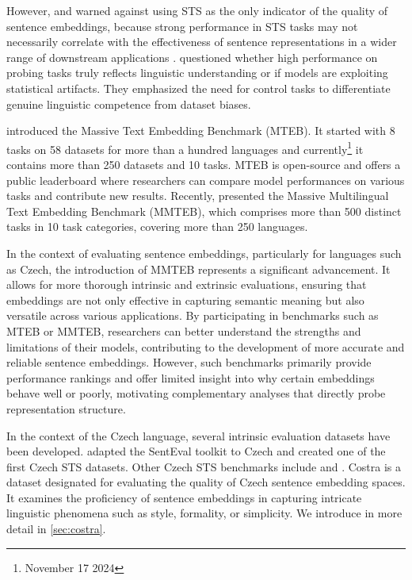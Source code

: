 However, \cite{zhelezniak-etal-2019-correlation} and \cite{wang-etal-2022-just} warned against using STS as the only indicator of the quality of sentence embeddings, because strong performance in STS tasks may not necessarily correlate with the effectiveness of sentence representations in a wider range of downstream applications \citep{neelakantan2022text}. \cite{hewitt-liang-2019-designing} questioned whether high performance on probing tasks truly reflects linguistic understanding or if models are exploiting statistical artifacts. They emphasized the need for control tasks to differentiate genuine linguistic competence from dataset biases.

\cite{muennighoff-etal-2023-mteb} introduced the Massive Text Embedding Benchmark (MTEB). It started with 8 tasks on 58 datasets for more than a hundred languages and currently\footnote{November 17 2024} it contains more than 250 datasets and 10 tasks. MTEB is open-source and offers a public leaderboard where researchers can compare model performances on various tasks and contribute new results. Recently, \cite{enevoldsen2025mmtebmassivemultilingualtext} presented the Massive Multilingual Text Embedding Benchmark (MMTEB), which comprises more than 500 distinct tasks in 10 task categories, covering more than 250 languages.

In the context of evaluating sentence embeddings, particularly for languages such as Czech, the introduction of MMTEB represents a significant advancement. It allows for more thorough intrinsic and extrinsic evaluations, ensuring that embeddings are not only effective in capturing semantic meaning but also versatile across various applications. By participating in benchmarks such as MTEB or MMTEB, researchers can better understand the strengths and limitations of their models, contributing to the development of more accurate and reliable sentence embeddings. However, such benchmarks primarily provide performance rankings and offer limited insight into why certain embeddings behave well or poorly, motivating complementary analyses that directly probe representation structure.

In the context of the Czech language, several intrinsic evaluation datasets have been developed. \cite{DBLP:conf/tsd/SvobodaB18} adapted the SentEval toolkit to Czech and created one of the first Czech STS datasets. Other Czech STS benchmarks include \cite{konopik-etal-2017-czech} and \cite{Sido2021CzechND}. Costra \citep{costra10, costra11} is a dataset designated for evaluating the quality of Czech sentence embedding spaces. It examines the proficiency of sentence embeddings in capturing intricate linguistic phenomena such as style, formality, or simplicity. We introduce \costra in more detail in \cref{sec:costra}.

